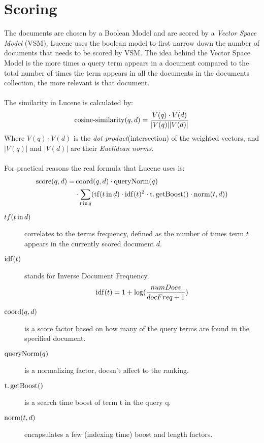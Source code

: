 \section{Scoring}
\label{sec:scoring}
The documents are chosen by a Boolean Model and are scored by a \emph{Vector
Space Model} (VSM)\footnotemark[1]. Lucene uses the boolean model to first
narrow down the number of documents that needs to be scored by VSM. The idea
behind the Vector Space Model is the more times a query term appears in a
document compared to the total number of times the term appears in all the
documents in the documents collection, the more relevant is that document.\\
\\
The similarity in Lucene is calculated by:
\[
	\operatorname{cosine-similarity}(q,d) = \frac{V(q) \cdot V(d)} {|V(q)||V(d)|}
\]
%
Where \(V(q) \cdot V(d)\) is the \emph{dot product}\footnotemark[2]
(intersection) of the weighted vectors, and \(|V(q)|\) and \(|V(d)|\) are their
\emph{Euclidean norms}\footnotemark[3].\\
\\
For practical reasons the real formula that Lucene uses is:
%
\begin{equation*}
\begin{split}
	\operatorname{score}(q,d) = & \operatorname{coord}(q,d) \cdot \operatorname{queryNorm}(q) \\
	                   & \cdot \sum_{t \operatorname{in} q} (
	                             \operatorname{tf}(t\operatorname{in}d) \cdot
	                             \operatorname{idf}(t)^{2} \cdot
	                             \operatorname{t.getBoost}() \cdot
	                             \operatorname{norm}(t,d)
	                           )
\end{split}
\end{equation*}
%
\begin{description}

\item[\(tf(t\operatorname{in}d)\)]
correlates to the terms frequency, defined as the number of times term \(t\)
appears in the currently scored document \(d\).

\item[\(\operatorname{idf}(t)\)]
stands for Inverse Document Frequency.
\[
	\operatorname{idf}(t) = 1 + \log(\frac{numDocs}{docFreq + 1})
\]

\item[\(\operatorname{coord}(q,d)\)]
is a score factor based on how many of the query terms are found in the
specified document.

\item[\(\operatorname{queryNorm}(q)\)]
is a normalizing factor, doesn’t affect to the ranking.

\item[\(\operatorname{t.getBoost}()\)]
is a search time boost of term t in the query q.

\item[\(\operatorname{norm}(t,d)\)]
encapsulates a few (indexing time) boost and length factors.

\end{description}



